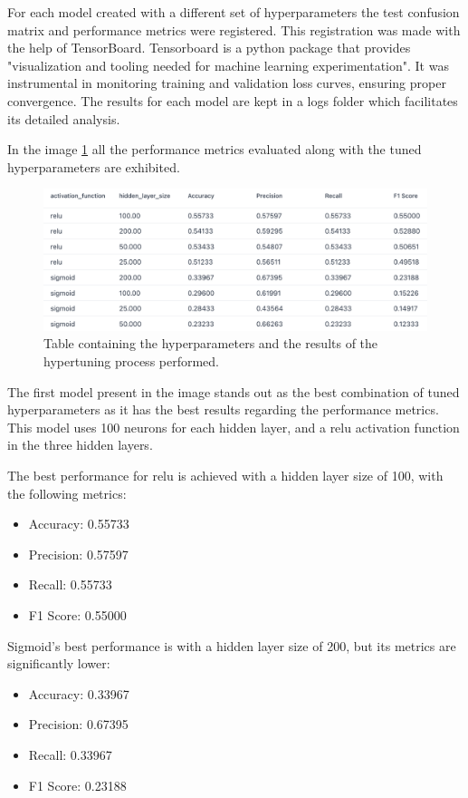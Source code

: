For each model created with a different set of hyperparameters the test confusion matrix and performance metrics were registered. This registration was made with the help of TensorBoard. Tensorboard is a python package that provides "visualization and tooling needed for machine learning experimentation"\cite{tensorboard}. It was instrumental in monitoring training and validation loss curves, ensuring proper convergence. The results for each model are kept in a logs folder which facilitates its detailed analysis.

In the image \ref{fig:FNN_table} all the performance metrics evaluated along with the tuned hyperparameters are exhibited.
\begin{figure}[H]
    \centering
    \includegraphics[width=1\linewidth]{images/FNN_tensorboard_table.png}
    \caption{Table containing the hyperparameters and the results of the hypertuning process performed.}
    \label{fig:FNN_table}
\end{figure}
The first model present in the image stands out as the best combination of tuned hyperparameters as it has the best results regarding the performance metrics. This model uses 100 neurons for each hidden layer, and a relu activation function in the three hidden layers. 

The best performance for relu is achieved with a hidden layer size of 100, with the following metrics:
\begin{itemize}
    \item Accuracy: 0.55733
    \item Precision: 0.57597
    \item Recall: 0.55733
    \item F1 Score: 0.55000
\end{itemize}

Sigmoid’s best performance is with a hidden layer size of 200, but its metrics are significantly lower:
\begin{itemize}
    \item Accuracy: 0.33967
    \item Precision: 0.67395
    \item Recall: 0.33967
    \item F1 Score: 0.23188
\end{itemize}

